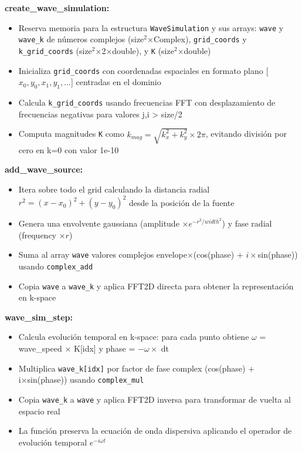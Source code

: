 \documentclass[a4paper]{article}
\begin{document}
\textbf{create\_wave\_simulation:}
\begin{itemize}
    \item Reserva memoria para la estructura \texttt{WaveSimulation} y sus arrays: \texttt{wave} y \texttt{wave\_k} de números complejos (size$^2$×Complex), \texttt{grid\_coords} y \texttt{k\_grid\_coords} (size$^2$×2×double), y \texttt{K} (size$^2$×double)
    \item Inicializa \texttt{grid\_coords} con coordenadas espaciales en formato plano [$x_0,y_0,x_1,y_1,...$] centradas en el dominio
    \item Calcula \texttt{k\_grid\_coords} usando frecuencias FFT con desplazamiento de frecuencias negativas para valores j,i > size/2
    \item Computa magnitudes \texttt{K} como $k_{mag} = \sqrt{k_x^2 + k_y^2} \times 2\pi$, evitando división por cero en k=0 con valor 1e-10
\end{itemize}

\textbf{add\_wave\_source:}
\begin{itemize}
    \item Itera sobre todo el grid calculando la distancia radial $r^2 = (x-x_0)^2 + (y-y_0)^2$ desde la posición de la fuente
    \item Genera una envolvente gaussiana (amplitude $\times e^{-r^2/width^2}$) y fase radial (frequency $\times r$)
    \item Suma al array \texttt{wave} valores complejos envelope$\times$(cos(phase) + $i\times$sin(phase)) usando \texttt{complex\_add}
    \item Copia \texttt{wave} a \texttt{wave\_k} y aplica FFT2D directa para obtener la representación en k-space
\end{itemize}

\textbf{wave\_sim\_step:}
\begin{itemize}
    \item Calcula evolución temporal en k-space: para cada punto obtiene $\omega$ = wave\_speed $\times$ K[idx] y phase = $-\omega \times$ dt
    \item Multiplica \texttt{wave\_k[idx]} por factor de fase complex (cos(phase) + i×sin(phase)) usando \texttt{complex\_mul}
    \item Copia \texttt{wave\_k} a \texttt{wave} y aplica FFT2D inversa para transformar de vuelta al espacio real
    \item La función preserva la ecuación de onda dispersiva aplicando el operador de evolución temporal $e^{-i\omega t}$
\end{itemize}
\end{document}
